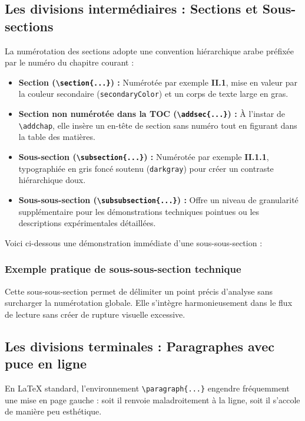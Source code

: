 \subsection{Les divisions intermédiaires : Sections et Sous-sections}
\label{subsec:sections_subsections}

La numérotation des sections adopte une convention hiérarchique arabe préfixée par le numéro du chapitre courant :
\begin{itemize}
  \item \textbf{Section (\texttt{\textbackslash section\{...\}}) :}
  Numérotée par exemple \textbf{II.1}, mise en valeur par la couleur secondaire (\texttt{secondaryColor}) et un corps de texte large en gras.
  \item \textbf{Section non numérotée dans la TOC (\texttt{\textbackslash addsec\{...\}}) :}
  À l'instar de \texttt{\textbackslash addchap}, elle insère un en-tête de section sans numéro tout en figurant dans la table des matières.
  \item \textbf{Sous-section (\texttt{\textbackslash subsection\{...\}}) :}
  Numérotée par exemple \textbf{II.1.1}, typographiée en gris foncé soutenu (\texttt{darkgray}) pour créer un contraste hiérarchique doux.
  \item \textbf{Sous-sous-section (\texttt{\textbackslash subsubsection\{...\}}) :}
  Offre un niveau de granularité supplémentaire pour les démonstrations techniques pointues ou les descriptions expérimentales détaillées.
\end{itemize}

Voici ci-dessous une démonstration immédiate d'une sous-sous-section :

\subsubsection{Exemple pratique de sous-sous-section technique}
Cette sous-sous-section permet de délimiter un point précis d'analyse sans surcharger la numérotation globale.
Elle s'intègre harmonieusement dans le flux de lecture sans créer de rupture visuelle excessive.

\subsection{Les divisions terminales : Paragraphes avec puce en ligne}
\label{subsec:paragraphes_lignes}

En \LaTeX{} standard, l'environnement \texttt{\textbackslash paragraph\{...\}} engendre fréquemment une mise en page gauche : soit il renvoie maladroitement à la ligne, soit il s'accole de manière peu esthétique.

